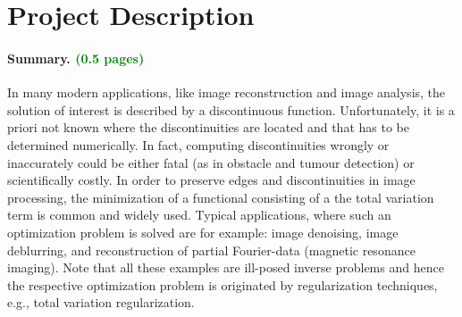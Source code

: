 \documentclass[enabledeprecatedfontcommands,cleardoublepage=empty,headsepline,twoside,11pt,DIV=15,BCOR=12mm,final]{scrartcl}
\begin{document}
%
\section*{Project Description}

\paragraph{Summary. \textcolor{green}{(0.5 pages)}} 

In many modern applications, like image reconstruction and image analysis, the solution of interest is described by a discontinuous function. Unfortunately, it is a priori not known where the discontinuities  are located and that has to be determined numerically. In fact, computing discontinuities wrongly or inaccurately could be either fatal (as in obstacle and tumour detection) or scientifically costly.  %
In order to preserve edges and discontinuities  in image processing, the minimization of a functional consisting of a the total variation term is common and widely used. Typical applications, where such an optimization problem is solved are for example: image denoising, image deblurring, and reconstruction of partial Fourier-data (magnetic resonance imaging). Note that all these examples are ill-posed inverse problems and hence the respective optimization problem is originated by regularization techniques, e.g., total variation regularization.
\end{document}

